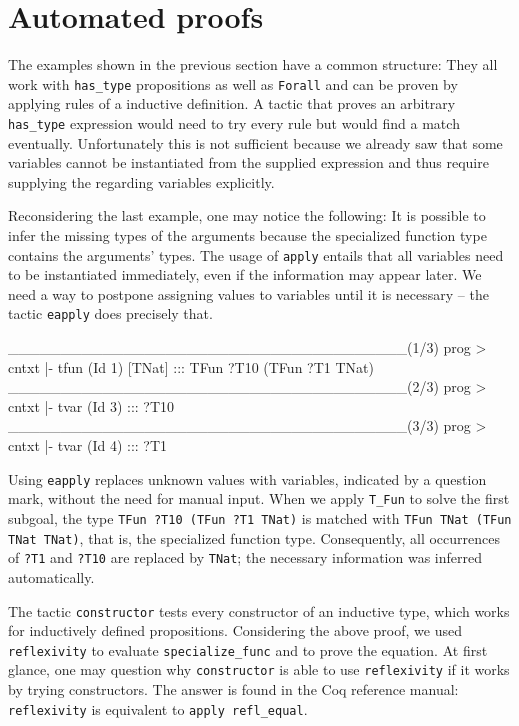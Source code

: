 \documentclass[paper = a4, fleqn, twoside]{scrreprt}
\newcommand{\coqinline}[1]{\texttt{#1}}
\begin{document}
\section{Automated proofs}
\label{autoproof}
The examples shown in the previous section have a common structure: They all work with \coqinline{has_type} propositions as well as \texttt{Forall} and can be proven by applying rules of a inductive definition. A tactic that proves an arbitrary \coqinline{has_type} expression would need to try every rule but would find a match eventually. Unfortunately this is not sufficient because we already saw that some variables cannot be instantiated from the supplied expression and thus require supplying the regarding variables explicitly.
\par
Reconsidering the last example, one may notice the following: It is possible to infer the missing types of the arguments because the specialized function type contains the arguments' types. The usage of \coqinline{apply} entails that all variables need to be instantiated immediately, even if the information may appear later. We need a way to postpone assigning values to variables until it is necessary -- the tactic \coqinline{eapply} does precisely that. 
\begin{coqcode}
______________________________________(1/3)
prog > cntxt |- tfun (Id 1) [TNat] ::: TFun ?T10 (TFun ?T1 TNat)
______________________________________(2/3)
prog > cntxt |- tvar (Id 3) ::: ?T10
______________________________________(3/3)
prog > cntxt |- tvar (Id 4) ::: ?T1
\end{coqcode}
Using \coqinline{eapply} replaces unknown values with variables, indicated by a question mark, without the need for manual input. When we apply \coqinline{T_Fun} to solve the first subgoal, the type \coqinline{TFun ?T10 (TFun ?T1 TNat)} is matched with \coqinline{TFun TNat (TFun TNat TNat)}, that is, the specialized function type. Consequently, all occurrences of \texttt{?T1} and \texttt{?T10} are replaced by \texttt{TNat}; the necessary information was inferred automatically.\\
\par \noindent
The tactic \coqinline{constructor} tests every constructor of an inductive type, which works for inductively defined propositions. Considering the above proof, we used \texttt{reflexivity} to evaluate \texttt{specialize\_func} and to prove the equation. At first glance, one may question why \texttt{constructor} is able to use \texttt{reflexivity} if it works by trying constructors. The answer is found in the Coq reference manual\citet{CoqManualV8}: \texttt{reflexivity} is equivalent to \texttt{apply refl\_equal}.
\end{document}
